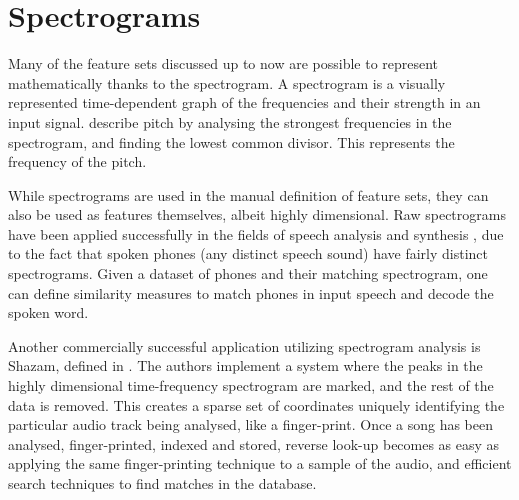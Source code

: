 \documentclass[12pt]{article}
\begin{document}
\section{Spectrograms}
Many of the feature sets discussed up to now are possible to represent mathematically thanks to the spectrogram. A spectrogram is a visually represented time-dependent graph of the frequencies and their strength in an input signal. \citet{Wold96} describe pitch by analysing the strongest frequencies in the spectrogram, and finding the lowest common divisor. This represents the frequency of the pitch. 

While spectrograms are used in the manual definition of feature sets, they can also be used as features themselves, albeit highly dimensional. Raw spectrograms have been applied successfully in the fields of speech analysis and synthesis \citep{flanagan2013speech}, due to the fact that spoken phones (any distinct speech sound) have fairly distinct spectrograms. Given a dataset of phones and their matching spectrogram, one can define similarity measures to match phones in input speech and decode the spoken word.

Another commercially successful application utilizing spectrogram analysis is Shazam, defined in \citet{Shazam03}. The authors implement a system where the peaks in the highly dimensional time-frequency spectrogram are marked, and the rest of the data is removed. This creates a sparse set of coordinates uniquely identifying the particular audio track being analysed, like a finger-print. Once a song has been analysed, finger-printed, indexed and stored, reverse look-up becomes as easy as applying the same finger-printing technique to a sample of the audio, and efficient search techniques to find matches in the database. 
\end{document}
